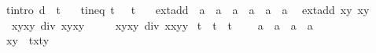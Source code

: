 \begin{isabellebody}
\ \ \ t{\isacharunderscore}intro{\isacharcolon}\ {\isachardoublequoteopen}d\ {\isacharequal}\ t{\isacharprime}{\isacharcircum}{}{\isachardoublequoteclose}\isanewline
\ \ \ t{\isacharunderscore}ineq{\isacharcolon}\ {\isachardoublequoteopen}t{\isacharprime}{\isacharcircum}{}\ {\isasymnoteq}\ {}{\isachardoublequoteclose}\ {\isachardoublequoteopen}t{\isacharprime}\ {\isasymnoteq}\ {}{\isachardoublequoteclose}\isanewline
{}\isanewline
\isanewline
{}\isamarkupfalse%
\ ext{\isacharunderscore}add\ {\isacharcolon}{\isacharcolon}\ {\isachardoublequoteopen}{\isacharprime}a\ {\isasymtimes}\ {\isacharprime}a\ {\isasymRightarrow}\ {\isacharprime}a\ {\isasymtimes}\ {\isacharprime}a\ {\isasymRightarrow}\ {\isacharprime}a\ {\isasymtimes}\ {\isacharprime}a{\isachardoublequoteclose}\ \isanewline
\ {\isachardoublequoteopen}ext{\isacharunderscore}add\ {\isacharparenleft}x{}{\isacharcomma}y{}{\isacharparenright}\ {\isacharparenleft}x{}{\isacharcomma}y{}{\isacharparenright}\ {\isacharequal}\isanewline
\ \ \ \ {\isacharparenleft}{\isacharparenleft}x{}{\isacharasterisk}y{}{\isacharminus}x{}{\isacharasterisk}y{}{\isacharparenright}\ div\ {\isacharparenleft}x{}{\isacharasterisk}y{}{\isacharminus}x{}{\isacharasterisk}y{}{\isacharparenright}{\isacharcomma}\isanewline
\ \ \ \ \ {\isacharparenleft}x{}{\isacharasterisk}y{}{\isacharplus}x{}{\isacharasterisk}y{}{\isacharparenright}\ div\ {\isacharparenleft}x{}{\isacharasterisk}x{}{\isacharplus}y{}{\isacharasterisk}y{}{\isacharparenright}{\isacharparenright}{\isachardoublequoteclose}\isanewline
\isanewline
{}\isamarkupfalse%
\ t\ \ {\isachardoublequoteopen}t\ {\isacharequal}\ t{\isacharprime}{\isachardoublequoteclose}\ \isanewline
\isanewline
{}\isamarkupfalse%
\ {\isasymtau}\ {\isacharcolon}{\isacharcolon}\ {\isachardoublequoteopen}{\isacharprime}a\ {\isasymtimes}\ {\isacharprime}a\ {\isasymRightarrow}\ {\isacharprime}a\ {\isasymtimes}\ {\isacharprime}a{\isachardoublequoteclose}\ \ \isanewline
\ \ {\isachardoublequoteopen}{\isasymtau}\ {\isacharparenleft}x{\isacharcomma}y{\isacharparenright}\ {\isacharequal}\ {\isacharparenleft}{}{\isacharslash}{\isacharparenleft}t{\isacharasterisk}x{\isacharparenright}{\isacharcomma}{}{\isacharslash}{\isacharparenleft}t{\isacharasterisk}y{\isacharparenright}{\isacharparenright}{\isachardoublequoteclose}\isanewline

\end{isabellebody}
